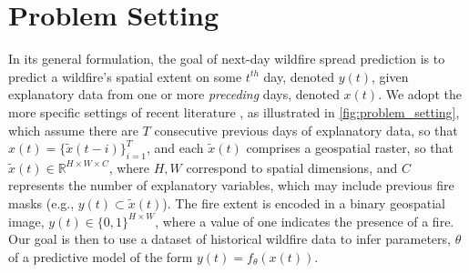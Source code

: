 
\section{Problem Setting}
\label{sec:problem_setting}
In its general formulation, the goal of next-day wildfire spread prediction is to predict a wildfire's spatial extent on some $t^{th}$ day, denoted $y(t)$, given  explanatory data from one or more \textit{preceding} days, denoted $x(t)$.  We adopt the more specific settings of recent literature \cite{gerard2023wildfirespreadts,huot2022next}, as illustrated in \cref{fig:problem_setting}, which assume there are $T$ consecutive previous days of explanatory data, so that $x(t)=\{ \tilde{x}(t-i) \}_{i=1}^{T}$, and each $\tilde{x}(t)$ comprises a geospatial raster, so that $\tilde{x}(t) \in \mathbb{R}^{H \times W \times C}$, where $H,W$ correspond to spatial dimensions, and $C$ represents the number of explanatory variables, which may include previous fire masks (e.g., $y(t) \subset \tilde{x}(t)$).  The fire extent is encoded in a binary geospatial image, $y(t) \in  \{0,1\}^{H \times W}$, where a value of one indicates the presence of a fire. Our goal is then to use a dataset of historical wildfire data to infer parameters, $\theta$ of a predictive model of the form $y(t) = f_{\theta}(x(t))$.    